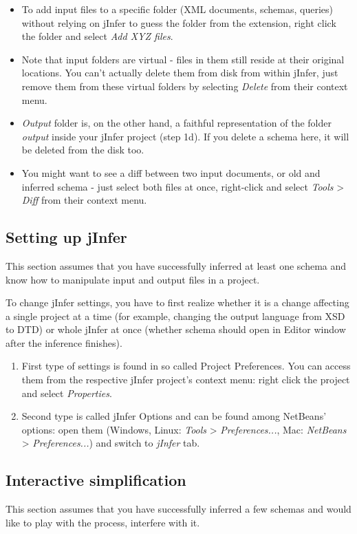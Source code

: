 \documentclass[a4paper,10pt,oneside]{article}
\begin{document}
\begin{itemize}\item 
 To add input files to a specific folder (XML documents, schemas, queries) without relying on jInfer to guess the folder from the extension, right click the folder and select \textit{Add XYZ files}.
  \item Note that input folders are virtual - files in them still reside at their original locations. You can't actually delete them from disk from within jInfer, just remove them from these virtual folders by selecting \textit{Delete} from their context menu.
  \item \textit{Output} folder is, on the other hand, a faithful representation of the folder \textit{output} inside your jInfer project (step 1d). If you delete a schema here, it will be deleted from the disk too.
  \item You might want to see a diff between two input documents, or old and inferred schema - just select both files at once, right-click and select \textit{Tools} > \textit{Diff} from their context menu.
  \end{itemize}
\subsection*{Setting up jInfer}
\par 
  This section assumes that you have successfully inferred at least one schema and know how to manipulate input and output files in a project.

\par 
  To change jInfer settings, you have to first realize whether it is a change affecting a single project at a time (for example, changing the output language from XSD to DTD) or whole jInfer at once (whether schema should open in Editor window after the inference finishes).

\begin{enumerate}\item 
 First type of settings is found in so called Project Preferences. You can access them from the respective jInfer project's context menu: right click the project and select \textit{Properties}.
  \item Second type is called jInfer Options and can be found among NetBeans' options: open them (Windows, Linux: \textit{Tools} > \textit{Preferences...}, Mac: \textit{NetBeans} > \textit{Preferences...}) and switch to \textit{jInfer} tab.
  \end{enumerate}
\subsection*{Interactive simplification}
\par 
  This section assumes that you have successfully
inferred a few schemas and would like to play with the process, interfere with it.
\end{document}
